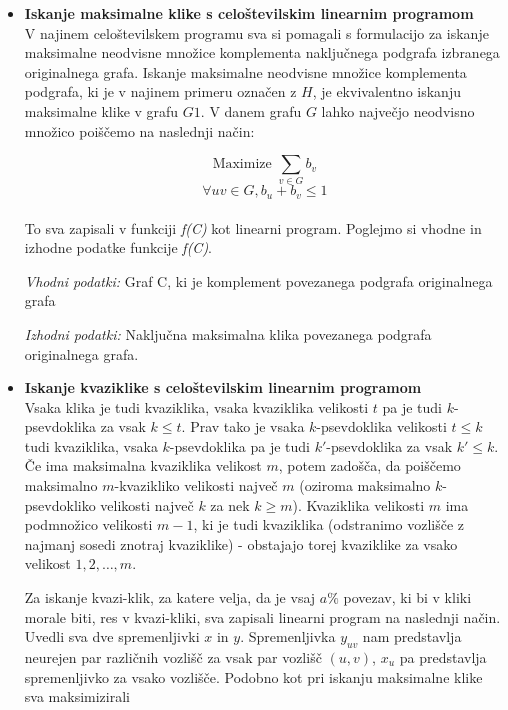 \documentclass[12pt,a4paper]{amsart}
\theoremstyle{definition}
\theoremstyle{plain}
\begin{document}
\begin{itemize}
\item \textbf{Iskanje maksimalne klike s celoštevilskim linearnim programom}
\\

V najinem celoštevilskem programu sva si pomagali s formulacijo za iskanje maksimalne neodvisne množice komplementa naključnega podgrafa izbranega originalnega grafa. Iskanje maksimalne neodvisne množice komplementa podgrafa, ki je v najinem primeru označen z $H$, je ekvivalentno iskanju maksimalne klike v grafu $G1$. V danem grafu $G$ lahko največjo neodvisno množico poiščemo na naslednji način:

 $$\text{Maximize }\sum_{v\in G}b_v$$ $$\forall uv \in G, b_u + b_v \le 1$$\\
 
To sva zapisali v funkciji \textit{f(C)} kot linearni program. Poglejmo si vhodne in izhodne podatke funkcije \textit{f(C)}.
 
\textit{Vhodni podatki:} Graf C, ki je komplement povezanega podgrafa originalnega grafa

\textit{Izhodni podatki:} Naključna maksimalna klika povezanega podgrafa originalnega grafa.
\\
\item \textbf{Iskanje kvaziklike s celoštevilskim linearnim programom}
\\

Vsaka klika je tudi kvaziklika, vsaka kvaziklika velikosti $t$ pa je tudi $k$-psevdoklika za vsak $k \le  t$. Prav tako je vsaka $k$-psevdoklika velikosti $t \le k$ tudi kvaziklika, vsaka $k$-psevdoklika pa je tudi $k'$-psevdoklika za vsak $k' \le k$. 
\\
Če ima maksimalna kvaziklika velikost $m$, potem zadošča, da poiščemo maksimalno $m$-kvazikliko velikosti največ $m$ (oziroma maksimalno $k$-psevdokliko velikosti največ $k$ za nek $k \geq m$). Kvaziklika velikosti $m$ ima podmnožico velikosti $m-1$, ki je tudi kvaziklika (odstranimo vozlišče z najmanj sosedi znotraj kvaziklike) - obstajajo torej kvaziklike za vsako velikost $1, 2, \ldots, m$.

Za iskanje kvazi-klik, za katere velja, da je vsaj $a\%$ povezav, ki bi v kliki morale biti, res v kvazi-kliki, sva zapisali linearni program na naslednji način. \\

Uvedli sva dve spremenljivki $x$ in $y$. Spremenljivka $y_{uv}$ nam predstavlja neurejen par različnih vozlišč za vsak par vozlišč $(u,v)$, $x_u$ pa predstavlja spremenljivko za vsako vozlišče. Podobno kot pri iskanju maksimalne klike sva maksimizirali


\end{itemize}
\end{document}
